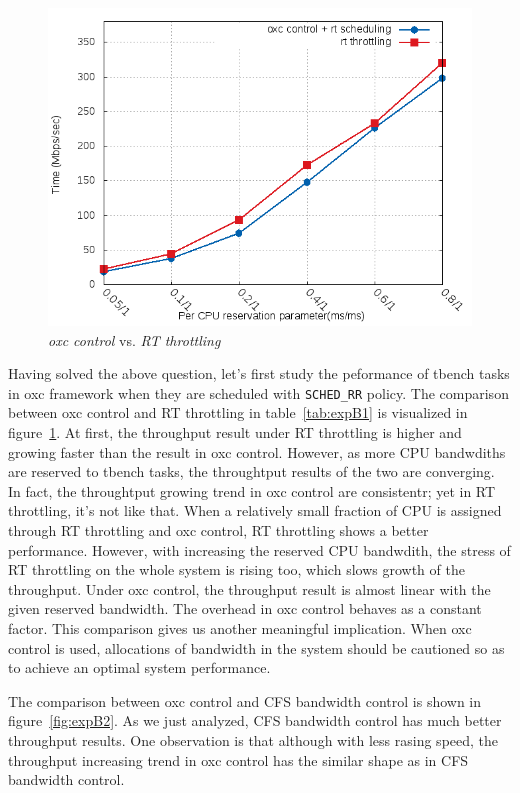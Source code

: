 \begin{figure}[htbp]
        \centering
        \includegraphics[width=\textwidth,totalheight=0.4\textheight]{images/expB1}
        \caption{\emph{oxc control} vs. \emph{RT throttling}}
        \label{fig:expB1}
\end{figure}

Having solved the above question, let's first study the peformance of tbench 
tasks in oxc framework when they are scheduled with \texttt{SCHED\_RR} 
policy. The comparison between oxc control and RT throttling in 
table~\ref{tab:expB1} is visualized in figure~\ref{fig:expB1}.
At first, the throughput result under RT throttling is higher and 
growing faster than the result in oxc control. However, as more CPU 
bandwdiths are reserved to tbench tasks, the throughtput results of the 
two are converging. In fact, the throughtput growing trend in oxc 
control are consistentr; yet in RT throttling, it's not like that.
When a relatively small fraction of CPU is assigned through RT throttling
and oxc control, RT throttling shows a better performance. However, with
increasing the reserved CPU bandwdith, the stress of RT throttling on
the whole system is rising too, which slows growth of the throughput. 
Under oxc control, the throughput result is almost linear with the 
given reserved bandwidth. The overhead in oxc control behaves as 
a constant factor.
This comparison gives us another meaningful implication. 
When oxc control is used, allocations of bandwidth in the system should be
cautioned so as to achieve an optimal system performance. 

The comparison between oxc control and CFS bandwidth control is shown 
in figure~\ref{fig:expB2}. As we just analyzed, CFS bandwidth control has
much better throughput results. One observation is that although with
less rasing speed, the throughput increasing trend in oxc control has the
similar shape as in CFS bandwidth control. 


